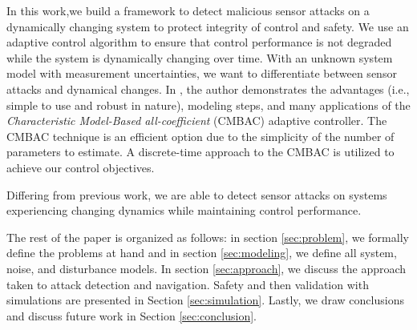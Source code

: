 In this work,we build a framework to detect malicious sensor attacks on a dynamically changing system to protect integrity of control and safety. We use an adaptive control algorithm to ensure that control performance is not degraded while the system is dynamically changing over time. With an unknown system model with measurement uncertainties, we want to differentiate between sensor attacks and dynamical changes. In \cite{4106038}, the author demonstrates the advantages (i.e., simple to use and robust in nature), modeling steps, and many applications of the \textit{Characteristic Model-Based all-coefficient} (CMBAC) adaptive controller. The CMBAC technique is an efficient option due to the simplicity of the number of parameters to estimate. A discrete-time approach to the CMBAC is utilized to achieve our control objectives.

Differing from previous work, we are able to detect sensor attacks on systems experiencing changing dynamics while maintaining control performance.

The rest of the paper is organized as follows: in section \ref{sec:problem}, we formally define the problems at hand and in section \ref{sec:modeling}, we define all system, noise, and disturbance models. In section \ref{sec:approach}, we discuss the approach taken to attack detection and navigation. Safety and then validation with simulations are presented in Section \ref{sec:simulation}. Lastly, we draw conclusions and discuss future work in Section \ref{sec:conclusion}.


